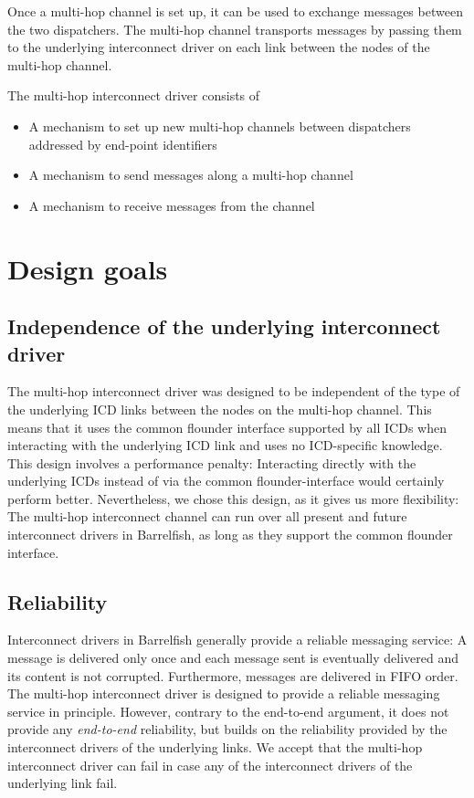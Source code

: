 \documentclass[a4paper,twoside]{report} %
\begin{document}
Once a multi-hop channel is set up, it can be used to exchange messages between the two dispatchers. The multi-hop channel transports messages by passing them to the underlying interconnect driver on each link between the nodes of the multi-hop channel. 

The multi-hop interconnect driver consists of
\begin{itemize}
\item A mechanism to set up new multi-hop channels between dispatchers addressed by end-point identifiers
\item A mechanism to send messages along a multi-hop channel
\item A mechanism to receive messages from the channel
\end{itemize}


\section{Design goals}

\subsection{Independence of the underlying interconnect driver}

The multi-hop interconnect driver was designed to be independent of the type of the underlying ICD links between the nodes on the multi-hop channel. This means that it uses the common flounder interface supported by all ICDs when interacting with the underlying ICD link and uses no ICD-specific knowledge. This design involves a performance penalty: Interacting directly with the underlying ICDs instead of via the common flounder-interface would certainly perform better. Nevertheless, we chose this design, as it gives us more flexibility: The multi-hop interconnect channel can run over all present and future interconnect drivers in Barrelfish, as long as they support the common flounder interface.

\subsection{Reliability}

Interconnect drivers in Barrelfish generally provide a reliable messaging service: A message is delivered only once and each message sent is eventually delivered and its content is not corrupted. Furthermore, messages are delivered in FIFO order. The multi-hop interconnect driver is designed to provide a reliable messaging service in principle. However, contrary to the end-to-end argument, it does not provide any \emph{end-to-end} reliability, but builds on the reliability provided by the interconnect drivers of the underlying links. We accept that the multi-hop interconnect driver can fail in case any of the interconnect drivers of the underlying link fail.
\end{document}
